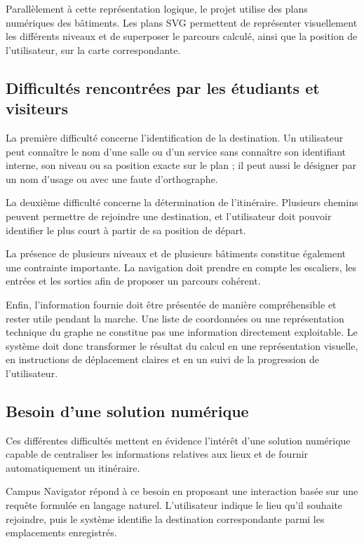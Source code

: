 \documentclass[12pt,a4paper]{report}
\begin{document}
Parallèlement à cette représentation logique, le projet utilise des plans numériques des
bâtiments. Les plans SVG permettent de représenter visuellement les différents niveaux et de
superposer le parcours calculé, ainsi que la position de l'utilisateur, sur la carte
correspondante.

\subsection{Difficultés rencontrées par les étudiants et visiteurs}

La première difficulté concerne l'identification de la destination. Un utilisateur peut connaître
le nom d'une salle ou d'un service sans connaître son identifiant interne, son niveau ou sa
position exacte sur le plan ; il peut aussi le désigner par un nom d'usage ou avec une faute
d'orthographe.

La deuxième difficulté concerne la détermination de l'itinéraire. Plusieurs chemins peuvent
permettre de rejoindre une destination, et l'utilisateur doit pouvoir identifier le plus court à
partir de sa position de départ.

La présence de plusieurs niveaux et de plusieurs bâtiments constitue également une contrainte
importante. La navigation doit prendre en compte les escaliers, les entrées et les sorties afin
de proposer un parcours cohérent.

Enfin, l'information fournie doit être présentée de manière compréhensible et rester utile
pendant la marche. Une liste de coordonnées ou une représentation technique du graphe ne
constitue pas une information directement exploitable. Le système doit donc transformer le
résultat du calcul en une représentation visuelle, en instructions de déplacement claires et en
un suivi de la progression de l'utilisateur.

\subsection{Besoin d'une solution numérique}

Ces différentes difficultés mettent en évidence l'intérêt d'une solution numérique capable de
centraliser les informations relatives aux lieux et de fournir automatiquement un itinéraire.

Campus Navigator répond à ce besoin en proposant une interaction basée sur une requête formulée en
langage naturel. L'utilisateur indique le lieu qu'il souhaite rejoindre, puis le système identifie
la destination correspondante parmi les emplacements enregistrés.
\end{document}
